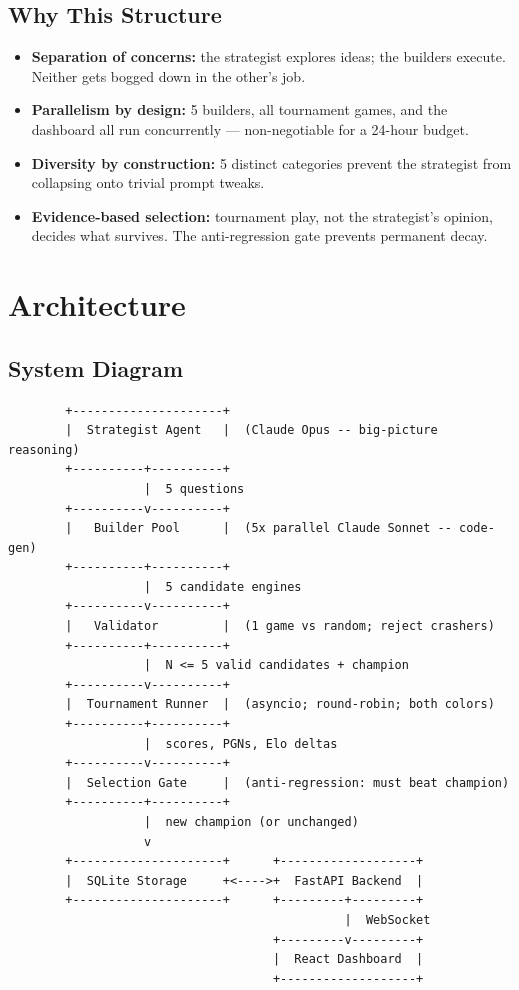 \documentclass[11pt]{article}
\begin{document}
\subsection{Why This Structure}

\begin{itemize}[leftmargin=*]
    \item \textbf{Separation of concerns:} the strategist explores ideas; the builders execute. Neither gets bogged down in the other's job.
    \item \textbf{Parallelism by design:} 5 builders, all tournament games, and the dashboard all run concurrently --- non-negotiable for a 24-hour budget.
    \item \textbf{Diversity by construction:} 5 distinct categories prevent the strategist from collapsing onto trivial prompt tweaks.
    \item \textbf{Evidence-based selection:} tournament play, not the strategist's opinion, decides what survives. The anti-regression gate prevents permanent decay.
\end{itemize}

\section{Architecture}

\subsection{System Diagram}

\begin{tcolorbox}[colback=gray!5,colframe=gray!50,arc=2mm]
\begin{verbatim}
        +---------------------+
        |  Strategist Agent   |  (Claude Opus -- big-picture reasoning)
        +----------+----------+
                   |  5 questions
        +----------v----------+
        |   Builder Pool      |  (5x parallel Claude Sonnet -- code-gen)
        +----------+----------+
                   |  5 candidate engines
        +----------v----------+
        |   Validator         |  (1 game vs random; reject crashers)
        +----------+----------+
                   |  N <= 5 valid candidates + champion
        +----------v----------+
        |  Tournament Runner  |  (asyncio; round-robin; both colors)
        +----------+----------+
                   |  scores, PGNs, Elo deltas
        +----------v----------+
        |  Selection Gate     |  (anti-regression: must beat champion)
        +----------+----------+
                   |  new champion (or unchanged)
                   v
        +---------------------+      +-------------------+
        |  SQLite Storage     +<---->+  FastAPI Backend  |
        +---------------------+      +---------+---------+
                                               |  WebSocket
                                     +---------v---------+
                                     |  React Dashboard  |
                                     +-------------------+
\end{verbatim}
\end{tcolorbox}
\end{document}
